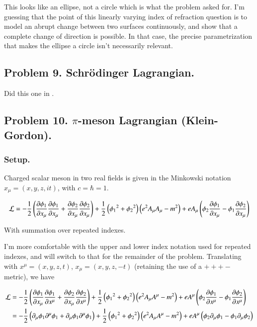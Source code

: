 This looks like an ellipse, not a circle which is what the problem asked for.  I'm guessing that the point of this 
linearly varying index of refraction question is to model an abrupt change between two surfaces continuously, and show that
a complete change of direction is possible.  In that case, the precise parametrization that makes the ellipse a circle isn't necessarily relevant.

\subsection{Problem 9.  Schr\"{o}dinger Lagrangian. }

Did this one in .

\subsection{Problem 10.  $\pi$-meson Lagrangian (Klein-Gordon). }

\subsubsection{Setup. }

Charged scalar meson in two real fields is given in the Minkowski notation $x_\mu = (x,y,z,it)$, with $c = \hbar = 1$.

\begin{align}
\LL = -\inv{2}\left( 
\PD{x_\mu}{\phi_1} \PD{x_\mu}{\phi_1} 
+ \PD{x_\mu}{\phi_2} \PD{x_\mu}{\phi_2} 
\right)
+ \inv{2}
\left( 
{\phi_1}^2 
+ {\phi_2}^2 
\right)
\left( e^2 A_\mu A_\mu - m^2 \right) 
+ e A_\mu \left(
\phi_2 \PD{x_\mu}{\phi_1}
-\phi_1 \PD{x_\mu}{\phi_2}
\right)
\end{align}

With summation over repeated indexes.

I'm more comfortable with the upper and lower index notation used for repeated indexes, and will switch to that for the remainder
of the problem.  Translating with $x^\mu = (x,y,z,t)$, $x_\mu = (x,y,z,-t)$ (retaining the use of a $+++-$ metric), we have

\begin{align}
\LL 
&= -\inv{2}\left( 
\PD{x_\mu}{\phi_1} \PD{x^\mu}{\phi_1} 
+ \PD{x_\mu}{\phi_2} \PD{x^\mu}{\phi_2} 
\right)
+ \inv{2}
\left( 
{\phi_1}^2 
+ {\phi_2}^2 
\right)
\left( e^2 A_\mu A^\mu - m^2 \right) 
+ e A^\mu \left(
\phi_2 \PD{x^\mu}{\phi_1}
-\phi_1 \PD{x^\mu}{\phi_2}
\right) \\
&= -\inv{2}\left( 
\partial_\mu \phi_1 \partial^\mu \phi_1
+\partial_\mu \phi_1 \partial^\mu \phi_1
\right)
+ \inv{2}
\left( 
{\phi_1}^2 
+ {\phi_2}^2 
\right)
\left( e^2 A_\mu A^\mu - m^2 \right) 
+ e A^\mu \left(
\phi_2 \partial_\mu {\phi_1}
-\phi_1 \partial_\mu {\phi_2}
\right) 
\end{align}

